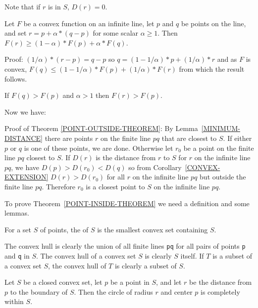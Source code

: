 \documentclass[12pt]{article}
\begin{document}
Note that if $r$ is in $S$, $D(r) = 0$.

\begin{lemma}
Let $F$ be a convex function on an infinite line,
let $p$ and $q$ be points on the line, and set $r=p+\alpha*(q-p)$
for some scalar $\alpha\ge 1$.  Then $F(r)\ge(1-\alpha)*F(p)+\alpha*F(q)$.
\end{lemma}
\begin{indpar}{0.2in}
Proof: $(1/\alpha)*(r-p) = q-p$ so $q = (1 - 1/\alpha)*p + (1/\alpha)*r$
and as $F$ is convex,
$F(q)\le(1-1/\alpha)*F(p)+(1/\alpha)*F(r)$ from which the result
follows.
\end{indpar}

\begin{corollary}\label{CONVEX-EXTENSION}
If $F(q)> F(p)$ and $\alpha>1$ then $F(r)> F(p)$.
\end{corollary}

Now we have:

\begin{indpar}{0.2in}
Proof of Theorem \ref{POINT-OUTSIDE-THEOREM}:
By Lemma~\ref{MINIMUM-DISTANCE} there are points $r$ on the
finite line $pq$ that are closest to $S$.  If either $p$ or $q$ is
one of these points, we are done.  Otherwise
let $r_0$ be a point on the finite line $pq$ closest to $S$.
If $D(r)$ is the distance from $r$ to $S$ for $r$ on the infinite line $pq$,
we have $D(p)>D(r_0)<D(q)$ so from Corollary~\ref{CONVEX-EXTENSION}
$D(r)>D(r_0)$ for all $r$ on the infinite line $pq$ but outside the
finite line $pq$.  Therefore $r_0$ is a closest point to $S$ on the
infinite line $pq$.
\end{indpar}


To prove Theorem~\ref{POINT-INSIDE-THEOREM}
we need a definition and some lemmas.

\begin{definition}
For a set $S$ of points, the  of $S$ is the
smallest convex set containing $S$.
\end{definition}

The convex hull is clearly the union of all finite lines {\tt pq} for
all pairs of points {\tt p} and {\tt q} in $S$.  The convex hull of
a convex set $S$ is clearly $S$ itself.
If $T$ is a subset of a convex set $S$,
the convex hull of $T$ is clearly a subset of $S$.

\begin{lemma}
Let $S$ be a closed convex set, let $p$ be a point in $S$, and
let $r$ be the distance from $p$ to the boundary of $S$.  Then
the circle of radius $r$ and center $p$ is completely within $S$.
\end{lemma}
\end{document}
